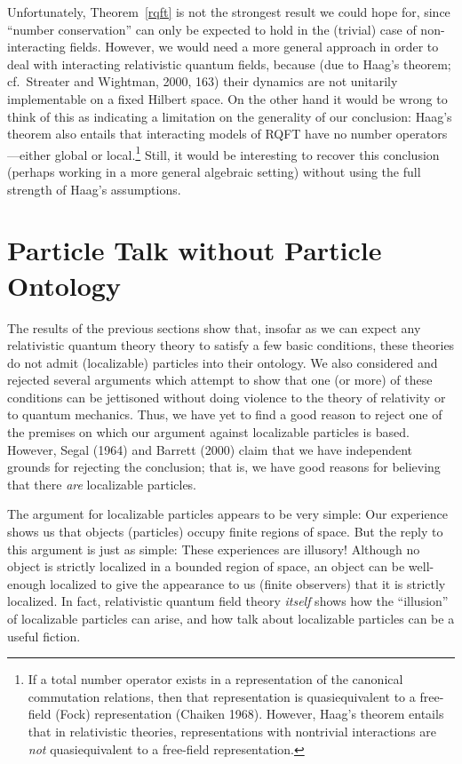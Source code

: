 \documentclass[12pt]{article}
\theoremstyle{remark}
\begin{document}
Unfortunately, Theorem~\ref{rqft} is not the strongest result we could
hope for, since ``number conservation'' can only be expected to hold
in the (trivial) case of non-interacting fields.  However, we would
need a more general approach in order to deal with interacting
relativistic quantum fields, because (due to Haag's theorem;
cf.~Streater and Wightman, 2000, 163) their dynamics are not unitarily
implementable on a fixed Hilbert space.  On the other hand it would be
wrong to think of this as indicating a limitation on the generality of
our conclusion: Haag's theorem also entails that interacting models of
RQFT have no number operators---either global or local.\footnote{If a
  total number operator exists in a representation of the canonical
  commutation relations, then that representation is quasiequivalent
  to a free-field (Fock) representation (Chaiken 1968).  However,
  Haag's theorem entails that in relativistic theories,
  representations with nontrivial interactions are \emph{not}
  quasiequivalent to a free-field representation.}  Still, it would be
interesting to recover this conclusion (perhaps working in a more
general algebraic setting) without using the full strength of Haag's
assumptions.

\section{Particle Talk without Particle Ontology}
The results of the previous sections show that, insofar as we can
expect any relativistic quantum theory theory to satisfy a few basic
conditions, these theories do not admit (localizable) particles into
their ontology.  We also considered and rejected several arguments
which attempt to show that one (or more) of these conditions can be
jettisoned without doing violence to the theory of relativity or to
quantum mechanics.  Thus, we have yet to find a good reason to reject
one of the premises on which our argument against localizable
particles is based.  However, Segal (1964) and Barrett (2000) claim
that we have independent grounds for rejecting the conclusion; that
is, we have good reasons for believing that there \emph{are}
localizable particles.

The argument for localizable particles appears to be very simple: Our
experience shows us that objects (particles) occupy finite regions of
space.  But the reply to this argument is just as simple: These
experiences are illusory!  Although no object is strictly localized in
a bounded region of space, an object can be well-enough localized to
give the appearance to us (finite observers) that it is strictly
localized.  In fact, relativistic quantum field theory \emph{itself}
shows how the ``illusion'' of localizable particles can arise, and how
talk about localizable particles can be a useful fiction.
\end{document}
